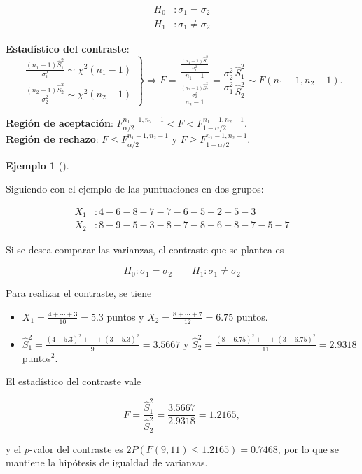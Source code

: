 \documentclass[
  spanish,
  a4paper,
]{scrreport}
\providecommand{\tightlist}{%
  \setlength{\itemsep}{0pt}\setlength{\parskip}{0pt}}
\theoremstyle{plain}
\theoremstyle{definition}
\newtheorem{example}{Ejemplo}[chapter]
\theoremstyle{definition}
\theoremstyle{remark}
\begin{document}
\begin{align*}
H_0 &: \sigma_1=\sigma_2 \\
H_1 &: \sigma_1\neq \sigma_2
\end{align*}

\textbf{Estadístico del contraste}: \[\left.
\begin{array}{l}
\displaystyle \frac{(n_1-1)\hat{S}_1^2}{\sigma_1^2}\sim \chi^2(n_1-1) \\
\displaystyle \frac{(n_2-1)\hat{S}_2^2}{\sigma_2^2}\sim \chi^2(n_2-1)
\end{array}
\right\}
\Rightarrow
F= \frac{\frac{\frac{(n_1-1)\hat{S}_1^2}{\sigma_1^2}}{n_1-1}}{\frac{\frac{(n_2-1)\hat{S}_2^2}{\sigma_2^2}}{n_2-1}} =
\frac{\sigma_2^2}{\sigma_1^2}\frac{\hat{S}_1^2}{\hat{S}_2^2}\sim F(n_1-1,n_2-1).
\]

\textbf{Región de aceptación}:
\(F_{\alpha/2}^{n_1-1,n_2-1} < F < F_{1-\alpha/2}^{n_1-1,n_2-1}\).\\
\textbf{Región de rechazo}: \(F\leq F_{\alpha/2}^{n_1-1,n_2-1}\) y
\(F\geq F_{1-\alpha/2}^{n_1-1,n_2-1}\).

\begin{example}[]\protect\hypertarget{exm-contraste-comparacion-varianzas}{}\label{exm-contraste-comparacion-varianzas}

Siguiendo con el ejemplo de las puntuaciones en dos grupos:

\begin{align*}
X_1 &: 4 - 6 - 8 - 7 - 7 - 6 - 5 - 2 - 5 - 3  \\
X_2 &: 8 - 9 - 5 - 3 - 8 - 7 - 8 - 6 - 8 - 7 - 5 - 7
\end{align*}

Si se desea comparar las varianzas, el contraste que se plantea es

\[
H_0: \sigma_1=\sigma_2\qquad H_1: \sigma_1\neq \sigma_2
\]

Para realizar el contraste, se tiene

\begin{itemize}
\tightlist
\item
  \(\bar{X}_1 = \frac{4+\cdots +3}{10}=5.3\) puntos y
  \(\bar{X}_2=\frac{8+\cdots +7}{12}=6.75\) puntos.
\item
  \(\hat{S}_1^2= \frac{(4-5.3)^2+\cdots + (3-5.3)^2}{9}=3.5667\) y
  \(\hat{S}_2^2= \frac{(8-6.75)^2+\cdots + (3-6.75)^2}{11}=2.9318\)
  puntos\(^2\).
\end{itemize}

El estadístico del contraste vale

\[
F = \frac{\hat{S}_1^2}{\hat{S}_2^2} = \frac{3.5667}{2.9318}=1.2165,
\]

y el \(p\)-valor del contraste es \(2P(F(9,11)\leq 1.2165)=0.7468\), por
lo que se mantiene la hipótesis de igualdad de varianzas.

\end{example}
\end{document}
